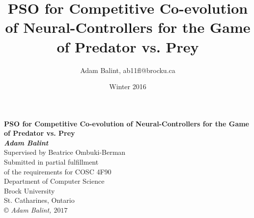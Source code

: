 \documentclass[12pt, letterpaper]{article}
\title{PSO for Competitive Co-evolution of Neural-Controllers for the Game of Predator vs. Prey}
\author{Adam Balint, ab11fl@brocku.ca}
\date{Winter 2016}
\begin{document}
\begin{titlepage}
\begin{center}
{\LARGE {\bf PSO for Competitive Co-evolution of Neural-Controllers for the Game of Predator vs. Prey}}
\\[3cm]
{\large{ \bf \textit{Adam Balint}}}
{\large \\ Supervised by Beatrice Ombuki-Berman}
\\[3cm]
{\large Submitted in partial fulfillment\\ of the requirements for COSC 4F90}
\\[3cm]
{\large Department of Computer Science\\Brock University\\
St. Catharines, Ontario}
\\[4cm]
\copyright \textit{ Adam Balint, $ 2017 $}
\end{center}
\end{titlepage}




\newpage


\tableofcontents

\newpage

\listoftables

\newpage

\listoffigures

\newpage 




 \newpage
 \newpage
 \newpage
 \newpage
 \newpage
 \newpage
 \newpage




%
%

\end{document}
